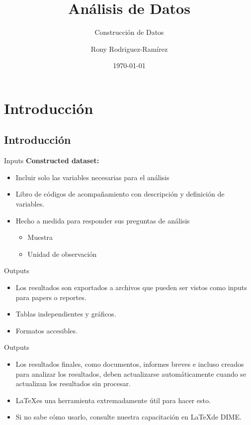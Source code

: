 \documentclass[10pt, aspectratio=169, compress]{beamer}
\title{Análisis de Datos}
\subtitle{Construcción de Datos}
\author{Rony Rodriguez-Ramírez}
\institute{LAMBDA}
\date{\today}
\begin{document}
\begin{frame}[plain]
	\maketitle 
\end{frame}
\section{Introducción}
\subsection{Introducción}
\begin{frame}[t]{Inputs}
	\textbf{Constructed dataset:}
	\begin{itemize}
		\item Incluir solo las variables necesarias para el análisis
		\item Libro de códigos de acompañamiento con descripción y definición de variables.
		\item Hecho a medida para responder sus preguntas de análisis
		\begin{itemize}
			\item Muestra
			\item Unidad de observación
		\end{itemize}
	\end{itemize}
\end{frame}
\begin{frame}[t]{Outputs}
	\begin{itemize}
		\item Los resultados son exportados a archivos que pueden ser vistos como inputs para papers o reportes.
		\item Tablas independientes y gráficos. 
		\item Formatos accesibles.
	\end{itemize}
\end{frame}
\begin{frame}[t]{Outputs}
	\begin{itemize}
		\item Los resultados finales, como documentos, informes breves e incluso creados para analizar los resultados, deben actualizarse automáticamente cuando se actualizan los resultados sin procesar.
		\item \LaTeX es una herramienta extremadamente útil para hacer esto.
		\item Si no sabe cómo usarlo, consulte nuestra capacitación en \LaTeX de DIME.
	\end{itemize}
\end{frame}
\end{document}
